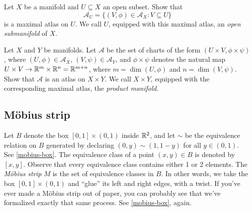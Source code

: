 \begin{exercise} \label{open-submanifold}
	Let $X$ be a manifold and $U \subseteq X$ an open subset. Show that \[ \mathscr{A}_U = \{ (V,\phi) \in \mathscr{A}_X : V \subseteq U \} \]
	is a maximal atlas on $U$. We call $U$, equipped with this maximal atlas, an \emph{open submanifold} of $X$. 
\end{exercise}

\begin{exercise}
	Let $X$ and $Y$ be manifolds. Let $\mathscr{A}$ be the set of charts of the form $(U \times V, \phi \times \psi)$, where $(U, \phi) \in \mathscr{A}_X$, $(V, \psi) \in \mathscr{A}_Y$, and $\phi \times \psi$ denotes the natural map $U \times V \to \mathbb{R}^m \times \mathbb{R}^n = \mathbb{R}^{m+n}$, where $m = \dim(U,\phi)$ and $n = \dim(V, \psi)$. Show that $\mathscr{A}$ is an atlas on $X \times Y$. We call $X \times Y$, equipped with the corresponding maximal atlas, the \emph{product manifold}. 
\end{exercise}

\subsection{M\"obius strip}

Let $B$ denote the box $[0,1] \times (0,1)$ inside $\mathbb{R}^2$, and let $\sim$ be the equivalence relation on $B$ generated by declaring $(0,y) \sim (1,1-y)$ for all $y \in (0,1)$. 
See \cref{mobius-box}. The equivalence class of a point $(x,y) \in B$ is denoted by $[x,y]$. Observe that every equivalence class contains either 1 or 2 elements. The \emph{M\"obius strip} $M$ is the set of equivalence classes in $B$. In other words, we take the box $[0,1] \times (0,1)$ and ``glue'' its left and right edges, with a twist. If you've ever made a M\"obius strip out of paper, you can probably see that we've formalized exactly that same process. See \cref{mobius-box}, again.

